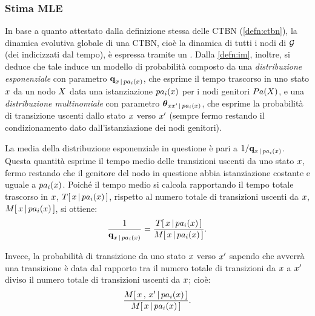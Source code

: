 \subsubsection{Stima \acl{MLE}}\label{subsec:ctbn-mle-params}
In base a quanto attestato dalla definizione stessa delle \acs{CTBN} (\vref{defn:ctbn}), la dinamica evolutiva globale di una \acs{CTBN}, cioè la dinamica di tutti i nodi di $\mathcal{G}$ (dei \mprocess{} \cond{} indicizzati dal tempo), è espressa tramite un \mprocess*{} \omog*{}. Dalla \autoref{defn:im}, inoltre, si deduce che tale \mprocess*{} induce un modello di probabilità composto da una \emph{distribuzione esponenziale} con parametro $\boldsymbol{\textbf{\text{q}}}_{x\,\arrowvert\,pa_i(\mathnormal{x})}$, che esprime il tempo trascorso in uno stato $\mathnormal{x}$ da un nodo $\mathnormal{X}$ data una istanziazione $pa_i(\mathnormal{x})$ per i nodi genitori $Pa(\mathnormal{X})$, e una \emph{distribuzione multinomiale} con parametro $\boldsymbol{\textbf{\text{$\theta$}}}_{\mathnormal{x}\mathnormal{x}^\prime\,\arrowvert\,pa_i(\mathnormal{x})}$, che esprime la probabilità di transizione uscenti dallo stato $\mathnormal{x}$ verso $\mathnormal{x}^\prime$ (sempre fermo restando il condizionamento dato dall'istanziazione dei nodi genitori).

La media della distribuzione esponenziale in questione è pari a $1/\boldsymbol{\textbf{\text{q}}}_{\mathnormal{x}\,\arrowvert\,pa_i(\mathnormal{x})}$. Questa quantità esprime il tempo medio delle transizioni uscenti da uno stato $\mathnormal{x}$, fermo restando che il genitore del nodo in questione abbia istanziazione costante e uguale a $pa_i(\mathnormal{x})$. Poiché il tempo medio si calcola rapportando il tempo totale trascorso in $\mathnormal{x}$, $T[\,\mathnormal{\mathnormal{x}\,\arrowvert\,pa_i(\mathnormal{x})}\,]$, rispetto al numero totale di transizioni uscenti da $\mathnormal{x}$, $\mstat{x\,\arrowvert\,pa_i(\setel{x})}$, si ottiene:
\[
\frac{1}{\param{q}_{\setel{x}\,\arrowvert\,pa_i(\setel{x})}}=\frac{\tstat{x\,\arrowvert\,pa_i(\setel{x})}}{\mstat{x\,\arrowvert\,pa_i(\setel{x})}}\text{.}
\]

Invece, la probabilità di transizione da uno stato $\mathnormal{x}$ verso $\mathnormal{x}^\prime$ sapendo che avverrà una transizione è data dal rapporto tra il numero totale di transizioni da $\mathnormal{x}$ a $\mathnormal{x}^\prime$ diviso il numero totale di transizioni uscenti da $\mathnormal{x}$; cioè:
\[
\frac{\mstat[x]{\setel{x}^\prime\,\arrowvert\,pa_i(\setel{x})}}{\mstat{\setel{x}\,\arrowvert\,pa_i(\setel{x})}}\text{.}
\]

